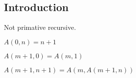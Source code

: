 
\subsection{Introduction}

Not primative recursive.

\(A(0,n) = n+1\)

\(A(m+1,0) = A(m,1)\)

\(A(m+1,n+1) = A(m,A(m+1,n))\)

